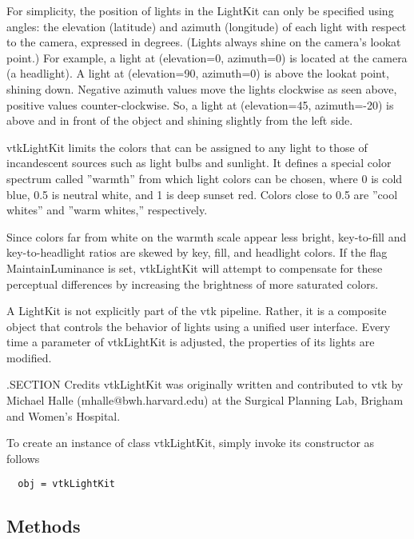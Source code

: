  For simplicity, the position of lights in the LightKit can only be
 specified using angles: the elevation (latitude) and azimuth
 (longitude) of each light with respect to the camera, expressed in
 degrees.  (Lights always shine on the camera's lookat point.) For
 example, a light at (elevation=0, azimuth=0) is located at the
 camera (a headlight).  A light at (elevation=90, azimuth=0) is
 above the lookat point, shining down.  Negative azimuth values move
 the lights clockwise as seen above, positive values
 counter-clockwise.  So, a light at (elevation=45, azimuth=-20) is
 above and in front of the object and shining slightly from the left
 side.

 vtkLightKit limits the colors that can be assigned to any light to
 those of incandescent sources such as light bulbs and sunlight.  It
 defines a special color spectrum called ''warmth'' from which light
 colors can be chosen, where 0 is cold blue, 0.5 is neutral white,
 and 1 is deep sunset red.  Colors close to 0.5 are ''cool whites'' and
 ''warm whites,'' respectively. 

 Since colors far from white on the warmth scale appear less bright,
 key-to-fill and key-to-headlight ratios are skewed by 
 key, fill, and headlight colors.  If the flag MaintainLuminance
 is set, vtkLightKit will attempt to compensate for these perceptual
 differences by increasing the brightness of more saturated colors.

 A LightKit is not explicitly part of the vtk pipeline.  Rather, it
 is a composite object that controls the behavior of lights using a
 unified user interface.  Every time a parameter of vtkLightKit is
 adjusted, the properties of its lights are modified.

 .SECTION Credits
 vtkLightKit was originally written and contributed to vtk by
 Michael Halle (mhalle@bwh.harvard.edu) at the Surgical Planning
 Lab, Brigham and Women's Hospital.

To create an instance of class vtkLightKit, simply
invoke its constructor as follows
\begin{verbatim}
  obj = vtkLightKit
\end{verbatim}
\subsection{Methods}

